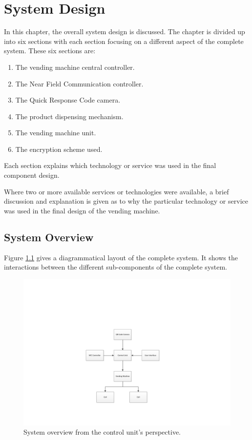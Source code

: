 \chapter{System Design}
\label{chap:3}

In this chapter, the overall system design is discussed. The chapter is divided up into 
six sections with each section focusing on a different aspect of the complete
system. These six sections are:

\begin{enumerate}
  \item The vending machine central controller.
  \item The Near Field Communication controller.
  \item The Quick Response Code camera.
  \item The product dispensing mechanism.
  \item The vending machine unit.
  \item The encryption scheme used.
\end{enumerate}

Each section explains which technology or service was used in the final
component design.

Where two or more available services or technologies were available,
a brief discussion and explanation is given as to why the particular technology or
service was used in the final design of the vending machine.

\section{System Overview}

Figure \ref{fig:system-overview-pi} gives a diagrammatical layout of the complete system.
It shows the interactions between the different sub-components of the complete system.

\begin{figure}
\centering
\includegraphics[clip=true, trim = 100 80 0 150, scale=0.7]{pi_system_overview}
\caption{System overview from the control unit's perspective.}
\label{fig:system-overview-pi}
\end{figure}

